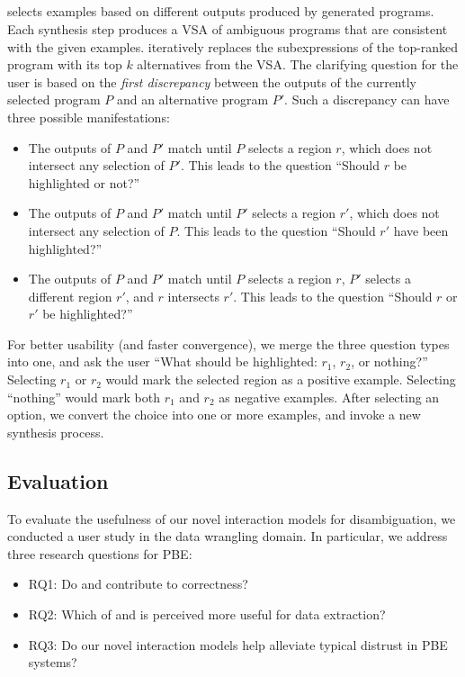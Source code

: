 \subsection{\ConversationalClarification}
\ConversationalClarification selects examples based on different outputs produced by generated programs.
Each synthesis step produces a VSA of ambiguous programs that are consistent with the given examples.
\ConversationalClarification iteratively replaces the subexpressions of the top-ranked program with its top $k$
alternatives from the VSA.
The clarifying question for the user is based on the \emph{first discrepancy} between the outputs of the currently
selected program $P$ and an alternative program $P'$.
Such a discrepancy can have three possible manifestations:
\begin{itemize}
    \item The outputs of $P$ and $P'$ match until $P$ selects a region $r$, which does not intersect any selection of
        $P'$.
        This leads to the question ``Should $r$ be highlighted or not?''
    \item The outputs of $P$ and $P'$ match until $P'$ selects a region $r'$, which does not intersect any selection of
        $P$.
        This leads to the question ``Should $r'$ have been highlighted?''
    \item The outputs of $P$ and $P'$ match until $P$ selects a region $r$, $P'$ selects a different region $r'$, and
        $r$ intersects
        $r'$.
        This leads to the question ``Should $r$ or $r'$ be highlighted?''
\end{itemize}
For better usability (and faster convergence), we merge the three question types into
one, and ask the user ``What should be highlighted: $r_1$, $r_2$, or nothing?''
Selecting $r_1$ or $r_2$ would mark the selected region as a positive example.
Selecting ``nothing'' would mark both $r_1$ and $r_2$ as negative examples.
After selecting an option, we convert the choice into one or more examples, and invoke a new synthesis process.

\subsection{Evaluation}


To evaluate the usefulness of our novel interaction models for disambiguation, we conducted a user study in the data
wrangling domain.
In particular, we address three research questions for PBE:
\newcommand{\RQOneShort}{RQ1}
\newcommand{\RQTwoShort}{RQ2}
\newcommand{\RQThreeShort}{RQ3}
\newcommand{\RQOne}{Do \ProgramNavigation and \ConversationalClarification contribute to correctness?}
\newcommand{\RQTwo}{Which of \ProgramNavigation and \ConversationalClarification is perceived more useful for data extraction?}
\newcommand{\RQThree}{Do our novel interaction models help alleviate typical distrust in PBE systems?}
\begin{itemize}[nosep]
    \item \RQOneShort: \RQOne
    \item \RQTwoShort: \RQTwo
    \item \RQThreeShort: \RQThree
\end{itemize}

